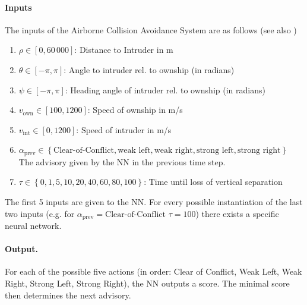 \documentclass[11pt,fleqn]{article}
\begin{document}
\paragraph*{Inputs}
The inputs of the Airborne Collision Avoidance System are as follows (see also )
\begin{enumerate}
    \item $\rho \in \left[0,60\,000\right]$: Distance to Intruder in m
    \item $\theta \in \left[-\pi,\pi\right]$: Angle to intruder rel. to ownship (in radians)
    \item $\psi \in \left[-\pi,\pi\right]$: Heading angle of intruder rel. to ownship (in radians)
    \item $v_{\text{own}} \in \left[100,1200\right]$: Speed of ownship in m/s
    \item $v_{\text{int}} \in \left[0,1200\right]$: Speed of intruder in m/s
    \item $\alpha_{\text{prev}}\in\left\{\text{Clear-of-Conflict}, \text{weak left}, \text{weak right}, \text{strong left}, \text{strong right}\right\}$\\
    The advisory given by the NN in the previous time step.
    \item $\tau \in \left\{0, 1, 5, 10, 20, 40, 60, 80, 100\right\}$: Time until loss of vertical separation
\end{enumerate}
The first 5 inputs are given to the NN.
For every possible instantiation of the last two inputs (e.g. for $\alpha_{\text{prev}}=\text{Clear-of-Conflict}$ $\tau=100$) there exists a specific neural network.


\paragraph*{Output.}
For each of the possible five actions (in order: Clear of Conflict, Weak Left, Weak Right, Strong Left, Strong Right),
the NN outputs a score.
The minimal score then determines the next advisory.
\end{document}
